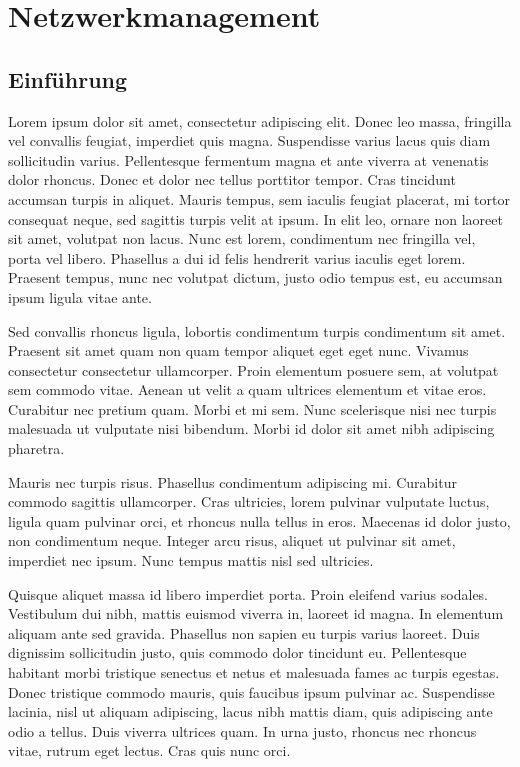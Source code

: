 



\chapter{Netzwerkmanagement}
\section{Einführung}

Lorem ipsum dolor sit amet, consectetur adipiscing elit. Donec leo massa, fringilla vel convallis feugiat, imperdiet quis magna. Suspendisse varius lacus quis diam sollicitudin varius. Pellentesque fermentum magna et ante viverra at venenatis dolor rhoncus. Donec et dolor nec tellus porttitor tempor. Cras tincidunt accumsan turpis in aliquet. Mauris tempus, sem iaculis feugiat placerat, mi tortor consequat neque, sed sagittis turpis velit at ipsum. In elit leo, ornare non laoreet sit amet, volutpat non lacus. Nunc est lorem, condimentum nec fringilla vel, porta vel libero. Phasellus a dui id felis hendrerit varius iaculis eget lorem. Praesent tempus, nunc nec volutpat dictum, justo odio tempus est, eu accumsan ipsum ligula vitae ante.

Sed convallis rhoncus ligula, lobortis condimentum turpis condimentum sit amet. Praesent sit amet quam non quam tempor aliquet eget eget nunc. Vivamus consectetur consectetur ullamcorper. Proin elementum posuere sem, at volutpat sem commodo vitae. Aenean ut velit a quam ultrices elementum et vitae eros. Curabitur nec pretium quam. Morbi et mi sem. Nunc scelerisque nisi nec turpis malesuada ut vulputate nisi bibendum. Morbi id dolor sit amet nibh adipiscing pharetra.

Mauris nec turpis risus. Phasellus condimentum adipiscing mi. Curabitur commodo sagittis ullamcorper. Cras ultricies, lorem pulvinar vulputate luctus, ligula quam pulvinar orci, et rhoncus nulla tellus in eros. Maecenas id dolor justo, non condimentum neque. Integer arcu risus, aliquet ut pulvinar sit amet, imperdiet nec ipsum. Nunc tempus mattis nisl sed ultricies.

Quisque aliquet massa id libero imperdiet porta. Proin eleifend varius sodales. Vestibulum dui nibh, mattis euismod viverra in, laoreet id magna. In elementum aliquam ante sed gravida. Phasellus non sapien eu turpis varius laoreet. Duis dignissim sollicitudin justo, quis commodo dolor tincidunt eu. Pellentesque habitant morbi tristique senectus et netus et malesuada fames ac turpis egestas. Donec tristique commodo mauris, quis faucibus ipsum pulvinar ac. Suspendisse lacinia, nisl ut aliquam adipiscing, lacus nibh mattis diam, quis adipiscing ante odio a tellus. Duis viverra ultrices quam. In urna justo, rhoncus nec rhoncus vitae, rutrum eget lectus. Cras quis nunc orci.

